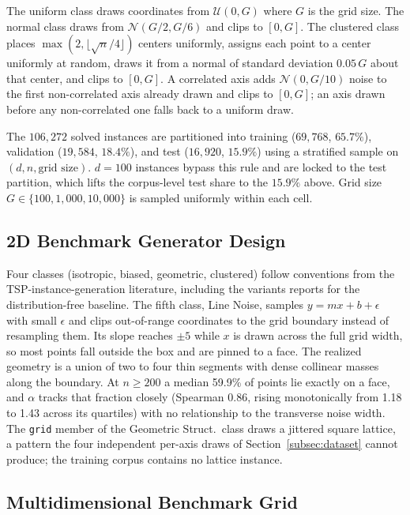\documentclass{article}
\begin{document}
The uniform class draws coordinates from $\mathcal{U}(0, G)$ where $G$ is the grid size. The normal class draws from $\mathcal{N}(G/2, G/6)$ and clips to $[0, G]$. The clustered class places $\max(2, \lfloor \sqrt{n}/4 \rfloor)$ centers uniformly, assigns each point to a center uniformly at random, draws it from a normal of standard deviation $0.05\,G$ about that center, and clips to $[0, G]$. A correlated axis adds $\mathcal{N}(0, G/10)$ noise to the first non-correlated axis already drawn and clips to $[0, G]$; an axis drawn before any non-correlated one falls back to a uniform draw.



The $106{,}272$ solved instances are partitioned into training ($69{,}768$, $65.7\%$), validation ($19{,}584$, $18.4\%$), and test ($16{,}920$, $15.9\%$) using a stratified sample on $(d, n, \text{grid size})$. $d = 100$ instances bypass this rule and are locked to the test partition, which lifts the corpus-level test share to the $15.9\%$ above. Grid size $G \in \{100, 1{,}000, 10{,}000\}$ is sampled uniformly within each cell.

\subsection{2D Benchmark Generator Design} \label{app:gen2d}

Four classes (isotropic, biased, geometric, clustered) follow conventions from the TSP-instance-generation literature, including the variants \citet{cavdar2015distribution} reports for the distribution-free baseline. The fifth class, Line Noise, samples $y = mx + b + \epsilon$ with small $\epsilon$ and clips out-of-range coordinates to the grid boundary instead of resampling them. Its slope reaches $\pm5$ while $x$ is drawn across the full grid width, so most points fall outside the box and are pinned to a face. The realized geometry is a union of two to four thin segments with dense collinear masses along the boundary. At $n\ge200$ a median 59.9\% of points lie exactly on a face, and $\alpha$ tracks that fraction closely (Spearman 0.86, rising monotonically from 1.18 to 1.43 across its quartiles) with no relationship to the transverse noise width. The \texttt{grid} member of the Geometric Struct.\ class draws a jittered square lattice, a pattern the four independent per-axis draws of Section~\ref{subsec:dataset} cannot produce; the training corpus contains no lattice instance.

\subsection{Multidimensional Benchmark Grid} \label{app:nd_grid_counts}
\end{document}
